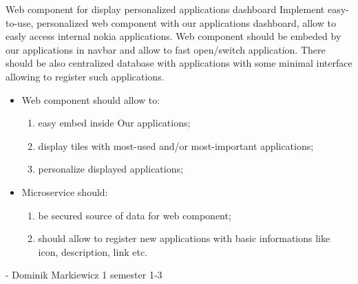 \begin{project}
{Web component for display personalized applications dashboard}
{Implement easy-to-use, personalized web component with our applications dashboard, allow to easly access internal nokia applications.  Web component should be embeded by our applications in navbar and allow to fast open/switch application. There should be also centralized database with applications with some minimal interface allowing to register such applications.} 
{
\begin{itemize}
	\item Web component should allow to:
		\begin{enumerate}
			\item easy embed inside Our applications;
			\item display tiles with most-used and/or most-important applications;
			\item personalize displayed applications;
		\end{enumerate}
	\item Microservice should:
		\begin{enumerate}
			\item be secured source of data for web component;
			\item should allow to register new applications with basic informations like icon, description, link etc.
		\end{enumerate}
\end{itemize}
}
{-}
{Dominik Markiewicz}
{1 semester}
{1-3}
\end{project}
